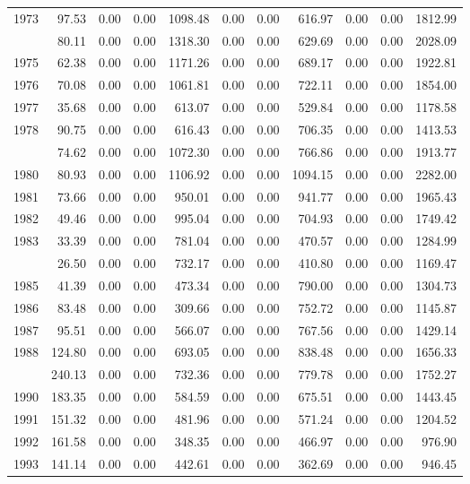 \begin{longtable}[t]{rrrrrrrrrrr}
1973 & 97.53 & 0.00 & 0.00 & 1098.48 & 0.00 & 0.00 & 616.97 & 0.00 & 0.00 & 1812.99\\
\addlinespace
1974 & 80.11 & 0.00 & 0.00 & 1318.30 & 0.00 & 0.00 & 629.69 & 0.00 & 0.00 & 2028.09\\
1975 & 62.38 & 0.00 & 0.00 & 1171.26 & 0.00 & 0.00 & 689.17 & 0.00 & 0.00 & 1922.81\\
1976 & 70.08 & 0.00 & 0.00 & 1061.81 & 0.00 & 0.00 & 722.11 & 0.00 & 0.00 & 1854.00\\
1977 & 35.68 & 0.00 & 0.00 & 613.07 & 0.00 & 0.00 & 529.84 & 0.00 & 0.00 & 1178.58\\
1978 & 90.75 & 0.00 & 0.00 & 616.43 & 0.00 & 0.00 & 706.35 & 0.00 & 0.00 & 1413.53\\
\addlinespace
1979 & 74.62 & 0.00 & 0.00 & 1072.30 & 0.00 & 0.00 & 766.86 & 0.00 & 0.00 & 1913.77\\
1980 & 80.93 & 0.00 & 0.00 & 1106.92 & 0.00 & 0.00 & 1094.15 & 0.00 & 0.00 & 2282.00\\
1981 & 73.66 & 0.00 & 0.00 & 950.01 & 0.00 & 0.00 & 941.77 & 0.00 & 0.00 & 1965.43\\
1982 & 49.46 & 0.00 & 0.00 & 995.04 & 0.00 & 0.00 & 704.93 & 0.00 & 0.00 & 1749.42\\
1983 & 33.39 & 0.00 & 0.00 & 781.04 & 0.00 & 0.00 & 470.57 & 0.00 & 0.00 & 1284.99\\
\addlinespace
1984 & 26.50 & 0.00 & 0.00 & 732.17 & 0.00 & 0.00 & 410.80 & 0.00 & 0.00 & 1169.47\\
1985 & 41.39 & 0.00 & 0.00 & 473.34 & 0.00 & 0.00 & 790.00 & 0.00 & 0.00 & 1304.73\\
1986 & 83.48 & 0.00 & 0.00 & 309.66 & 0.00 & 0.00 & 752.72 & 0.00 & 0.00 & 1145.87\\
1987 & 95.51 & 0.00 & 0.00 & 566.07 & 0.00 & 0.00 & 767.56 & 0.00 & 0.00 & 1429.14\\
1988 & 124.80 & 0.00 & 0.00 & 693.05 & 0.00 & 0.00 & 838.48 & 0.00 & 0.00 & 1656.33\\
\addlinespace
1989 & 240.13 & 0.00 & 0.00 & 732.36 & 0.00 & 0.00 & 779.78 & 0.00 & 0.00 & 1752.27\\
1990 & 183.35 & 0.00 & 0.00 & 584.59 & 0.00 & 0.00 & 675.51 & 0.00 & 0.00 & 1443.45\\
1991 & 151.32 & 0.00 & 0.00 & 481.96 & 0.00 & 0.00 & 571.24 & 0.00 & 0.00 & 1204.52\\
1992 & 161.58 & 0.00 & 0.00 & 348.35 & 0.00 & 0.00 & 466.97 & 0.00 & 0.00 & 976.90\\
1993 & 141.14 & 0.00 & 0.00 & 442.61 & 0.00 & 0.00 & 362.69 & 0.00 & 0.00 & 946.45\\

\end{longtable}
